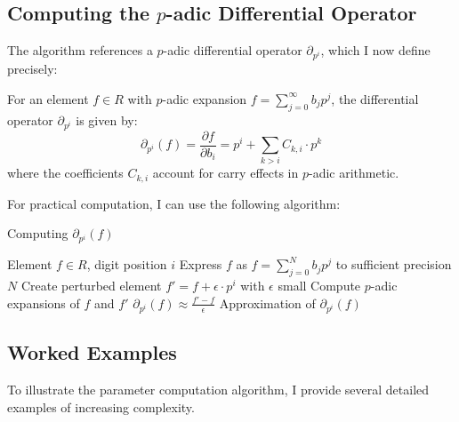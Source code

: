 \subsection{Computing the $p$-adic Differential Operator}

The algorithm references a $p$-adic differential operator $\partial_{p^i}$, which I now define precisely:

\begin{definition}
For an element $f \in R$ with $p$-adic expansion $f = \sum_{j=0}^{\infty} b_j p^j$, the differential operator $\partial_{p^i}$ is given by:
$$\partial_{p^i}(f) = \frac{\partial f}{\partial b_i} = p^i + \sum_{k > i} C_{k,i} \cdot p^k$$
where the coefficients $C_{k,i}$ account for carry effects in $p$-adic arithmetic.
\end{definition}

For practical computation, I can use the following algorithm:

\begin{algorithm}[H]
\caption{Computing $\partial_{p^i}(f)$}
\label{alg:p-adic-differential}
\begin{algorithmic}[1]
\Require Element $f \in R$, digit position $i$
\State Express $f$ as $f = \sum_{j=0}^{N} b_j p^j$ to sufficient precision $N$
\State Create perturbed element $f' = f + \epsilon \cdot p^i$ with $\epsilon$ small
\State Compute $p$-adic expansions of $f$ and $f'$
\State $\partial_{p^i}(f) \approx \frac{f' - f}{\epsilon}$
\Ensure Approximation of $\partial_{p^i}(f)$
\end{algorithmic}
\end{algorithm}

\subsection{Worked Examples}

To illustrate the parameter computation algorithm, I provide several detailed examples of increasing complexity.

